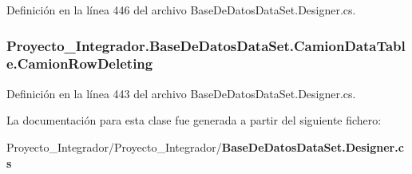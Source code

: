 Definición en la línea 446 del archivo Base\-De\-Datos\-Data\-Set.\-Designer.\-cs.

\subsubsection[{Camion\-Row\-Deleting}]{ Proyecto\-\_\-\-Integrador.\-Base\-De\-Datos\-Data\-Set.\-Camion\-Data\-Table.\-Camion\-Row\-Deleting}\label{class_proyecto___integrador_1_1_base_de_datos_data_set_1_1_camion_data_table_af32609c5e07c43debc5af4a9405b3399}


Definición en la línea 443 del archivo Base\-De\-Datos\-Data\-Set.\-Designer.\-cs.



La documentación para esta clase fue generada a partir del siguiente fichero\-:\begin{DoxyCompactItemize}
\item 
Proyecto\-\_\-\-Integrador/\-Proyecto\-\_\-\-Integrador/{\bf Base\-De\-Datos\-Data\-Set.\-Designer.\-cs}\end{DoxyCompactItemize}

